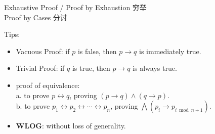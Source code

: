 \documentclass[12pt, a4paper, UTF8, openany]{ctexbook}
\newcommand{\bi}{\leftrightarrow} %
\newcommand{\bigand}{\bigwedge}
\begin{document}
    Exhaustive Proof / Proof by Exhaustion 穷举 \\
    Proof by Cases 分讨

    Tips:
    \begin{itemize}
        \item Vacuous Proof: if $p$ is false, then $p \to q$ is immediately true.
        \item Trivial Proof: if $q$ is true, then $p \to q$ is always true.
        \item proof of equivalence: \\
            a. to prove $p \bi q$, proving $(p \to q) \land (q \to p)$. \\
            b. to prove $p_1 \bi p_2 \bi \cdots \bi p_n$, proving $\bigand (p_i \to p_{i \bmod n + 1})$.
        \item \textbf{WLOG}: without loss of generality.
    \end{itemize}
\end{document}
